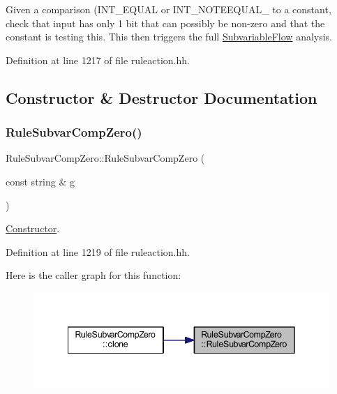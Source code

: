 Given a comparison (I\+N\+T\+\_\+\+E\+Q\+U\+AL or I\+N\+T\+\_\+\+N\+O\+T\+E\+E\+Q\+U\+A\+L\+\_\+ to a constant, check that input has only 1 bit that can possibly be non-\/zero and that the constant is testing this. This then triggers the full \mbox{\hyperlink{class_subvariable_flow}{Subvariable\+Flow}} analysis. 

Definition at line 1217 of file ruleaction.\+hh.



\subsection{Constructor \& Destructor Documentation}
\mbox{\label{class_rule_subvar_comp_zero_a303be962f9e6e92847aa968ccf2969ae}} 
\subsubsection{\texorpdfstring{RuleSubvarCompZero()}{RuleSubvarCompZero()}}
{\footnotesize\ttfamily Rule\+Subvar\+Comp\+Zero\+::\+Rule\+Subvar\+Comp\+Zero (\begin{DoxyParamCaption}\item[{const string \&}]{g }\end{DoxyParamCaption})\hspace{0.3cm}{\ttfamily [inline]}}



\mbox{\hyperlink{class_constructor}{Constructor}}. 



Definition at line 1219 of file ruleaction.\+hh.

Here is the caller graph for this function\+:
\nopagebreak
\begin{figure}[H]
\begin{center}
\leavevmode
\includegraphics[width=342pt]{class_rule_subvar_comp_zero_a303be962f9e6e92847aa968ccf2969ae_icgraph}
\end{center}
\end{figure}


